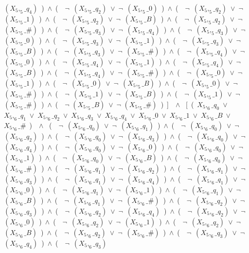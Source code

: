 ﻿\documentclass[a4paper,10pt]{article}
\begin{document}
$(X_5,_5\_q_4)$\ )\ $\wedge$\ (\ \ $\neg$\ $(X_5,_5\_q_2)$\ $\vee$\ $\neg$\ $(X_5,_5\_0)$\ )\ $\wedge$\ (\ \ $\neg$\ $(X_5,_5\_q_2)$\ $\vee$\ $\neg$\ $(X_5,_5\_1)$\ )\ $\wedge$\ (\ \ $\neg$\ $(X_5,_5\_q_2)$\ $\vee$\ $\neg$\ $(X_5,_5\_B)$\ )\ $\wedge$\ (\ \ $\neg$\ $(X_5,_5\_q_2)$\ $\vee$\ $\neg$\ $(X_5,_5\_\#)$\ )\ $\wedge$\ (\ \ $\neg$\ $(X_5,_5\_q_3)$\ $\vee$\ $\neg$\ $(X_5,_5\_q_4)$\ )\ $\wedge$\ (\ \ $\neg$\ $(X_5,_5\_q_3)$\ $\vee$\ $\neg$\ $(X_5,_5\_0)$\ )\ $\wedge$\ (\ \ $\neg$\ $(X_5,_5\_q_3)$\ $\vee$\ $\neg$\ $(X_5,_5\_1)$\ )\ $\wedge$\ (\ \ $\neg$\ $(X_5,_5\_q_3)$\ $\vee$\ $\neg$\ $(X_5,_5\_B)$\ )\ $\wedge$\ (\ \ $\neg$\ $(X_5,_5\_q_3)$\ $\vee$\ $\neg$\ $(X_5,_5\_\#)$\ )\ $\wedge$\ (\ \ $\neg$\ $(X_5,_5\_q_4)$\ $\vee$\ $\neg$\ $(X_5,_5\_0)$\ )\ $\wedge$\ (\ \ $\neg$\ $(X_5,_5\_q_4)$\ $\vee$\ $\neg$\ $(X_5,_5\_1)$\ )\ $\wedge$\ (\ \ $\neg$\ $(X_5,_5\_q_4)$\ $\vee$\ $\neg$\ $(X_5,_5\_B)$\ )\ $\wedge$\ (\ \ $\neg$\ $(X_5,_5\_q_4)$\ $\vee$\ $\neg$\ $(X_5,_5\_\#)$\ )\ $\wedge$\ (\ \ $\neg$\ $(X_5,_5\_0)$\ $\vee$\ $\neg$\ $(X_5,_5\_1)$\ )\ $\wedge$\ (\ \ $\neg$\ $(X_5,_5\_0)$\ $\vee$\ $\neg$\ $(X_5,_5\_B)$\ )\ $\wedge$\ (\ \ $\neg$\ $(X_5,_5\_0)$\ $\vee$\ $\neg$\ $(X_5,_5\_\#)$\ )\ $\wedge$\ (\ \ $\neg$\ $(X_5,_5\_1)$\ $\vee$\ $\neg$\ $(X_5,_5\_B)$\ )\ $\wedge$\ (\ \ $\neg$\ $(X_5,_5\_1)$\ $\vee$\ $\neg$\ $(X_5,_5\_\#)$\ )\ $\wedge$\ (\ \ $\neg$ $(X_5,_5\_B)$\ $\vee$\ $\neg$ $(X_5,_5\_\#)$\ )\ ]\ \ $\wedge$ \ [\ (\ $X_5,_6\_q_0$\ $\vee$\ $X_5,_6\_q_1$\ $\vee$\ $X_5,_6\_q_2$\ $\vee$\ $X_5,_6\_q_3$\ $\vee$\ $X_5,_6\_q_4$\ $\vee$\ $X_5,_6\_0$\ $\vee$\ $X_5,_6\_1$\ $\vee$\ $X_5,_6\_B$\ $\vee$\ $X_5,_6\_\#$\ )\ \ $\wedge$ \ (\ \ $\neg$\ $(X_5,_6\_q_0)$\ $\vee$\ $\neg$\ $(X_5,_6\_q_1)$\ )\ $\wedge$\ (\ \ $\neg$\ $(X_5,_6\_q_0)$\ $\vee$\ $\neg$\ $(X_5,_6\_q_2)$\ )\ $\wedge$\ (\ \ $\neg$\ $(X_5,_6\_q_0)$\ $\vee$\ $\neg$\ $(X_5,_6\_q_3)$\ )\ $\wedge$\ (\ \ $\neg$\ $(X_5,_6\_q_0)$\ $\vee$\ $\neg$\ $(X_5,_6\_q_4)$\ )\ $\wedge$\ (\ \ $\neg$\ $(X_5,_6\_q_0)$\ $\vee$\ $\neg$\ $(X_5,_6\_0)$\ )\ $\wedge$\ (\ \ $\neg$\ $(X_5,_6\_q_0)$\ $\vee$\ $\neg$\ $(X_5,_6\_1)$\ )\ $\wedge$\ (\ \ $\neg$\ $(X_5,_6\_q_0)$\ $\vee$\ $\neg$\ $(X_5,_6\_B)$\ )\ $\wedge$\ (\ \ $\neg$\ $(X_5,_6\_q_0)$\ $\vee$\ $\neg$\ $(X_5,_6\_\#)$\ )\ $\wedge$\ (\ \ $\neg$\ $(X_5,_6\_q_1)$\ $\vee$\ $\neg$\ $(X_5,_6\_q_2)$\ )\ $\wedge$\ (\ \ $\neg$\ $(X_5,_6\_q_1)$\ $\vee$\ $\neg$\ $(X_5,_6\_q_3)$\ )\ $\wedge$\ (\ \ $\neg$\ $(X_5,_6\_q_1)$\ $\vee$\ $\neg$\ $(X_5,_6\_q_4)$\ )\ $\wedge$\ (\ \ $\neg$\ $(X_5,_6\_q_1)$\ $\vee$\ $\neg$\ $(X_5,_6\_0)$\ )\ $\wedge$\ (\ \ $\neg$\ $(X_5,_6\_q_1)$\ $\vee$\ $\neg$\ $(X_5,_6\_1)$\ )\ $\wedge$\ (\ \ $\neg$\ $(X_5,_6\_q_1)$\ $\vee$\ $\neg$\ $(X_5,_6\_B)$\ )\ $\wedge$\ (\ \ $\neg$\ $(X_5,_6\_q_1)$\ $\vee$\ $\neg$\ $(X_5,_6\_\#)$\ )\ $\wedge$\ (\ \ $\neg$\ $(X_5,_6\_q_2)$\ $\vee$\ $\neg$\ $(X_5,_6\_q_3)$\ )\ $\wedge$\ (\ \ $\neg$\ $(X_5,_6\_q_2)$\ $\vee$\ $\neg$\ $(X_5,_6\_q_4)$\ )\ $\wedge$\ (\ \ $\neg$\ $(X_5,_6\_q_2)$\ $\vee$\ $\neg$\ $(X_5,_6\_0)$\ )\ $\wedge$\ (\ \ $\neg$\ $(X_5,_6\_q_2)$\ $\vee$\ $\neg$\ $(X_5,_6\_1)$\ )\ $\wedge$\ (\ \ $\neg$\ $(X_5,_6\_q_2)$\ $\vee$\ $\neg$\ $(X_5,_6\_B)$\ )\ $\wedge$\ (\ \ $\neg$\ $(X_5,_6\_q_2)$\ $\vee$\ $\neg$\ $(X_5,_6\_\#)$\ )\ $\wedge$\ (\ \ $\neg$\ $(X_5,_6\_q_3)$\ $\vee$\ $\neg$\ $(X_5,_6\_q_4)$\ )\ $\wedge$\ (\ \ $\neg$\ $(X_5,_6\_q_3)$\ 
\end{document}
